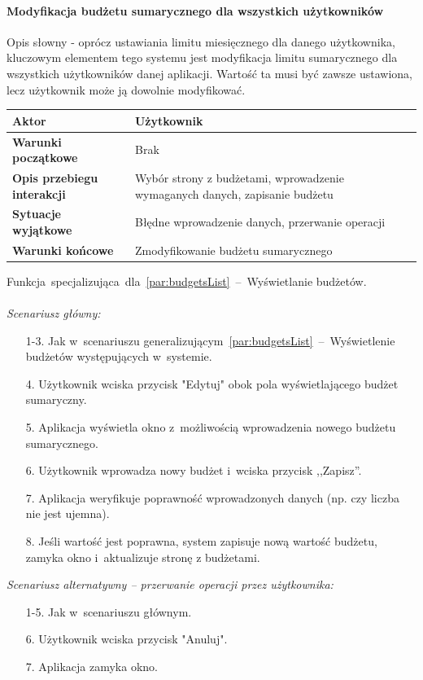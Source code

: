 \paragraph{Modyfikacja budżetu sumarycznego dla wszystkich użytkowników\newline}
\label{par:usersBudget}
Opis słowny - oprócz ustawiania limitu miesięcznego dla danego użytkownika, kluczowym
elementem tego systemu jest modyfikacja  limitu sumarycznego dla wszystkich użytkowników
danej aplikacji. Wartość ta musi być zawsze ustawiona, lecz użytkownik może ją dowolnie modyfikować.
\begin{longtable}{|p{5cm}|p{7cm}|}
 	\hline
	\textbf{Aktor} & Użytkownik \\
	\hline
	\textbf{Warunki początkowe} & Brak
	\\
	\hline
	\textbf{Opis przebiegu interakcji} & Wybór strony z budżetami, wprowadzenie wymaganych danych,
	zapisanie budżetu
	\\
	\hline
	\textbf{Sytuacje wyjątkowe} & Błędne wprowadzenie danych, przerwanie operacji
	\\
	\hline
	\textbf{Warunki końcowe} & Zmodyfikowanie budżetu sumarycznego
	\\
	\hline
 \end{longtable}
Funkcja~specjalizująca~dla~\ref{par:budgetsList}~--~Wyświetlanie budżetów.\\\\
\textit{Scenariusz główny:}
\begin{enumerate}
  \item[1-3.] Jak w~scenariuszu generalizującym~\ref{par:budgetsList}~--~Wyświetlenie budżetów występujących w~systemie.
  \item[4.] Użytkownik wciska przycisk "Edytuj" obok pola wyświetlającego budżet sumaryczny.
  \item[5.] Aplikacja wyświetla okno z~możliwością wprowadzenia nowego budżetu sumarycznego.
  \item[6.] Użytkownik wprowadza nowy budżet i~wciska przycisk ,,Zapisz''.
  \item[7.] Aplikacja weryfikuje poprawność wprowadzonych danych (np. czy liczba nie jest ujemna).
  \item[8.] Jeśli wartość jest poprawna, system zapisuje nową wartość budżetu, zamyka okno i~aktualizuje stronę z budżetami.
\end{enumerate}
\textit{Scenariusz alternatywny -- przerwanie operacji przez użytkownika:}
\begin{enumerate}
  \item[1-5.] Jak w~scenariuszu głównym.
  \item[6.] Użytkownik wciska przycisk "Anuluj".
  \item[7.] Aplikacja zamyka okno.
\end{enumerate}
